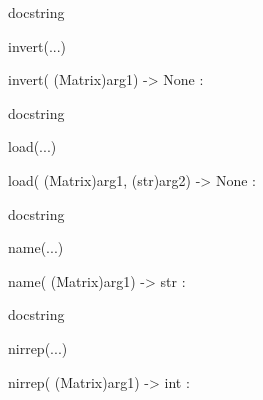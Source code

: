 \documentclass[letterpaper,10pt,english]{sphinxmanual}
\begin{document}
\begin{description}
\begin{description}
\begin{DUlineblock}{0em}
\begin{DUlineblock}{\DUlineblockindent}
\item[]
\begin{DUlineblock}{\DUlineblockindent}
\item[] docstring
\item[] 
\end{DUlineblock}
\end{DUlineblock}
\item[] invert(...)
\item[]
\begin{DUlineblock}{\DUlineblockindent}
\item[] invert( (Matrix)arg1) -\textgreater{} None :
\item[]
\begin{DUlineblock}{\DUlineblockindent}
\item[] docstring
\item[] 
\end{DUlineblock}
\end{DUlineblock}
\item[] load(...)
\item[]
\begin{DUlineblock}{\DUlineblockindent}
\item[] load( (Matrix)arg1, (str)arg2) -\textgreater{} None :
\item[]
\begin{DUlineblock}{\DUlineblockindent}
\item[] docstring
\item[] 
\end{DUlineblock}
\end{DUlineblock}
\item[] name(...)
\item[]
\begin{DUlineblock}{\DUlineblockindent}
\item[] name( (Matrix)arg1) -\textgreater{} str :
\item[]
\begin{DUlineblock}{\DUlineblockindent}
\item[] docstring
\item[] 
\end{DUlineblock}
\end{DUlineblock}
\item[] nirrep(...)
\item[]
\begin{DUlineblock}{\DUlineblockindent}
\item[] nirrep( (Matrix)arg1) -\textgreater{} int :
\item[]
\begin{DUlineblock}{\DUlineblockindent}

\end{DUlineblock}
\end{DUlineblock}
\end{DUlineblock}
\end{description}
\end{description}
\end{document}
